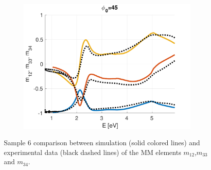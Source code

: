 \begin{figure}[h!]
\begin{subfigure}{0.32\linewidth}
        \includegraphics[width=\linewidth, trim= 0cm 0cm 2cm 0cm, clip]{figures/ch4/S6/NCS/S6_NCS_phi45.pdf}
   \end{subfigure}
   \caption{Sample 6 comparison between simulation (solid colored lines) and experimental data (black dashed lines) of the MM elements $m_{12}$,$m_{33}$ and $m_{34}$.}
   \label{fig:S6_NCS}
\end{figure}
\clearpage


